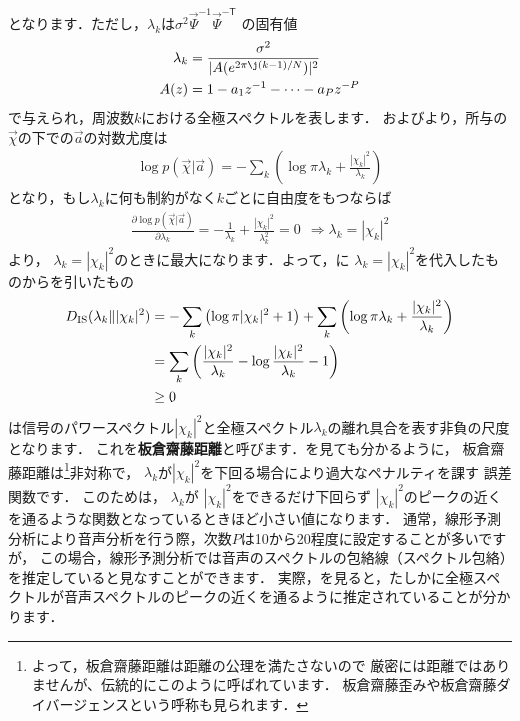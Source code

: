 となります．ただし，$\lambda_k$は$\sigma^2\Vec{\Psi}^{-1}\Vec{\Psi}^{- \mathsf T}$
の固有値
\begin{align}
\lambda_k &= \frac{\sigma^2}{|A(e^{2\pi\j(k-1)/N})|^2}\label{eq:allpole}\\
A(z) &= 1- a_1z^{-1} - \cdots -a_P z^{-P}
\end{align}
で与えられ，周波数$k$における全極スペクトルを表します．
およびより，所与の$\Vec{\chi}$の下での$\Vec{a}$の対数尤度は
\begin{align}
\log p(\Vec{\chi}|\Vec{a}) = 
- \sum_k 
\left(\log \pi \lambda_k
+
\frac{|\chi_k|^2}{\lambda_k} 
\right)
\label{eq:X_loglikelihood}
\end{align}
となり，もし$\lambda_k$に何も制約がなく$k$ごとに自由度をもつならば
\begin{align}
\frac{\partial \log p(\Vec{\chi}|\Vec{a})}{\partial \lambda_k}=
-
\frac{1}{\lambda_k} 
+
\frac{|\chi_k|^2}{\lambda_k^2}
=0
~~
\Rightarrow
\lambda_k=|\chi_k|^2
\end{align}
より，
$\lambda_k=|\chi_k|^2$のときに最大になります．よって，に
$\lambda_k=|\chi_k|^2$を代入したものからを引いたもの
\begin{align}
D_{\rm IS}(\lambda_k\||\chi_k|^2) &=
- 
\sum_k 
\left(\log \pi |\chi_k|^2
+
1
\right)
+
\sum_k 
\left(\log \pi \lambda_k
+
\frac{|\chi_k|^2}{\lambda_k} 
\right)
\nonumber\\
&=
\sum_k 
\left( 
\frac{|\chi_k|^2}{\lambda_k} - \log \frac{|\chi_k|^2}{\lambda_k} - 1
\right)
\nonumber\\
&\ge 0
\label{eq:ISdivergence}
\end{align}
は信号のパワースペクトル$|\chi_k|^2$と全極スペクトル$\lambda_k$の離れ具合を表す非負の尺度となります．
これを{\bf 板倉齋藤距離}と呼びます\cite{Itakura1972}．を見ても分かるように，
板倉齋藤距離は\footnote{よって，板倉齋藤距離は距離の公理を満たさないので
厳密には距離ではありませんが、伝統的にこのように呼ばれています．
板倉齋藤歪みや板倉齋藤ダイバージェンスという呼称も見られます．}{非対称}で，
$\lambda_k$が$|\chi_k|^2$を下回る場合により過大なペナルティを課す
誤差関数です．
このためは，
$\lambda_k$が
$|\chi_k|^2$をできるだけ下回らず
$|\chi_k|^2$のピークの近くを通るような関数となっているときほど小さい値になります．
通常，線形予測分析により音声分析を行う際，次数$P$は10から20程度に設定することが多いですが，
この場合，線形予測分析では音声のスペクトルの包絡線（スペクトル包絡）を推定していると見なすことができます．
実際，を見ると，たしかに全極スペクトルが音声スペクトルのピークの近くを通るように推定されていることが分かります．


